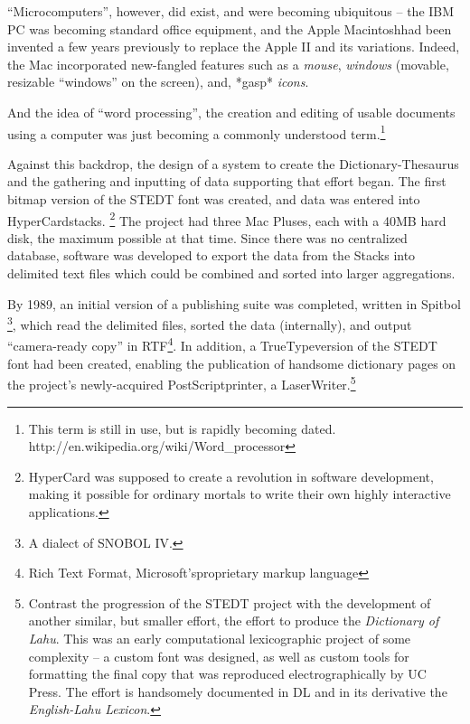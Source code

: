 ``Microcomputers'', however, did exist, and were becoming ubiquitous -- the IBM PC was becoming standard
office equipment, and the Apple Macintosh\texttrademark had been invented
a few years previously to replace the Apple II and its variations.  
Indeed, the Mac incorporated new-fangled features such
as a {\it mouse}, {\it windows} (movable, resizable ``windows'' on the
screen), and, *gasp* {\it icons}.

And the idea of ``word processing'', the creation and editing of usable
documents using a computer was just becoming a commonly understood
term.\footnote{This term is still in use, but is rapidly becoming
dated. http://en.wikipedia.org/wiki/Word\_processor}

Against this backdrop, the design of a system to create 
the Dictionary-Thesaurus and the gathering and inputting of data supporting
that effort began.  The first bitmap version of
the STEDT font was created, and data was entered into HyperCard\texttrademark stacks.
\footnote{HyperCard was supposed to create a revolution in software
  development, making it possible for ordinary mortals to write their
  own highly interactive applications.}  The project had three Mac Pluses\texttrademark, each with a 40MB hard
disk, the maximum possible at that time.  Since there was no
centralized database, software was developed to export the data from the Stacks
into delimited text files which could be combined and sorted into
larger aggregations.

By 1989, an initial version of a publishing suite was completed, written in Spitbol \footnote{A
  dialect of SNOBOL IV.}, which read the delimited files, sorted the
data (internally), and output ``camera-ready copy'' in
RTF\footnote{Rich Text Format, Microsoft's\texttrademark proprietary markup
  language}.   In addition, a TrueType\texttrademark version of the STEDT font
had been created, enabling the publication of handsome dictionary
pages on the project's newly-acquired PostScript\texttrademark printer, a
LaserWriter\texttrademark.\footnote{Contrast the progression of the
  STEDT project with the development of another similar, but smaller
  effort, the effort to produce the {\it Dictionary of Lahu}. This was
  an early computational lexicographic project of some complexity -- a custom
  font was designed, as well as custom tools for formatting the final
  copy that was reproduced electrographically by UC Press.  The effort
  is handsomely documented in DL and in its derivative the {\it English-Lahu Lexicon}.}

